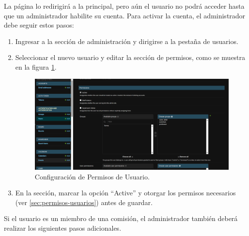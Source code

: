 La página lo redirigirá a la principal, pero aún el usuario no podrá acceder hasta que un administrador habilite su cuenta. Para activar la cuenta, el administrador debe seguir estos pasos:

\begin{enumerate}
    \item Ingresar a la sección de administración y dirigirse a la pestaña de usuarios.
    \item Seleccionar el nuevo usuario y editar la sección de permisos, como se muestra en la figura \ref{fig:user-permission}.


    \begin{figure}[H]
        \centering
        \includegraphics[width=1\linewidth]{fig/user-permission.png}
        \caption{Configuración de Permisos de Usuario.}
        \label{fig:user-permission}
    \end{figure}
    
    \item En la sección, marcar la opción ``Active'' y otorgar los permisos necesarios (ver \ref{sec:permisos-usuarios}) antes de guardar.

\end{enumerate}

Si el usuario es un miembro de una comisión, el administrador también deberá realizar los siguientes pasos adicionales.

